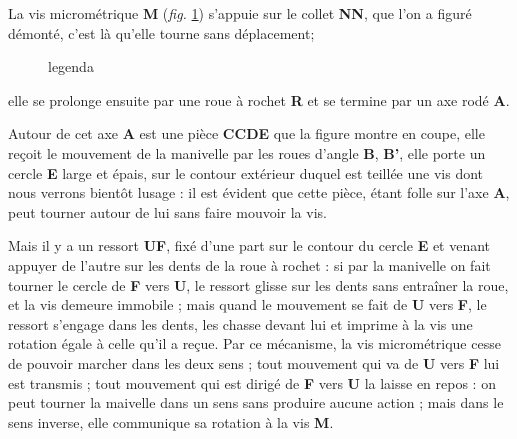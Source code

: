 \documentclass[a4paper, 12pt]{article} %
\begin{document}
La vis micrométrique \textbf{M} (\textit{fig.} \ref{fig4}) s'appuie sur le collet \textbf{NN}, que l'on a figuré démonté, c'est là qu'elle tourne sans déplacement; 

\begin{figure}[H]
	\begin{center}
	\end{center}
	\caption{legenda}
	\label{fig4}
\end{figure}

elle se prolonge ensuite par une roue à rochet \textbf{R} et se termine par un axe rodé \textbf{A}.

Autour de cet axe \textbf{A} est une pièce \textbf{CCDE} que la figure montre en coupe, elle reçoit le mouvement de la manivelle par les roues d'angle \textbf{B}, \textbf{B'}, elle porte un cercle \textbf{E} large et épais, sur le contour extérieur duquel est teillée une vis dont nous verrons bientôt lusage : il est évident que cette pièce, étant folle sur l'axe \textbf{A}, peut tourner autour de lui sans faire mouvoir la vis.

Mais il y a un ressort \textbf{UF}, fixé d'une part sur le contour du cercle \textbf{E} et venant appuyer de l'autre sur les dents de la roue à rochet : si par la manivelle on fait tourner le cercle de \textbf{F} vers \textbf{U}, le ressort glisse sur les dents sans entraîner la roue, et la vis demeure immobile ; mais quand le mouvement se fait de \textbf{U} vers \textbf{F}, le ressort s'engage dans les dents, les chasse devant lui et imprime à la vis une rotation égale à celle qu'il a reçue. Par ce mécanisme, la vis micrométrique cesse de pouvoir marcher dans les deux sens ; tout mouvement qui va de \textbf{U} vers \textbf{F} lui est transmis ; tout mouvement qui est dirigé de \textbf{F} vers \textbf{U} la laisse en repos : on peut tourner la maivelle dans un sens sans produire aucune action ; mais dans le sens inverse, elle communique sa rotation à la vis \textbf{M}.
\end{document}
